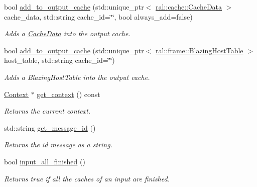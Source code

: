 \begin{DoxyCompactItemize}
bool \hyperlink{classral_1_1cache_1_1kernel_ad8cd102392bbece14178c0ebf9f0c6bc}{add\+\_\+to\+\_\+output\+\_\+cache} (std\+::unique\+\_\+ptr$<$ \hyperlink{classral_1_1cache_1_1CacheData}{ral\+::cache\+::\+Cache\+Data} $>$ cache\+\_\+data, std\+::string cache\+\_\+id=\char`\"{}\char`\"{}, bool always\+\_\+add=false)
\begin{DoxyCompactList}\small\item\em Adds a \hyperlink{classral_1_1cache_1_1CacheData}{Cache\+Data} into the output cache. \end{DoxyCompactList}\item 
bool \hyperlink{classral_1_1cache_1_1kernel_a94e93c7bb81d9a3a7729fa84a7cf07c1}{add\+\_\+to\+\_\+output\+\_\+cache} (std\+::unique\+\_\+ptr$<$ \hyperlink{classral_1_1frame_1_1BlazingHostTable}{ral\+::frame\+::\+Blazing\+Host\+Table} $>$ host\+\_\+table, std\+::string cache\+\_\+id=\char`\"{}\char`\"{})
\begin{DoxyCompactList}\small\item\em Adds a Blazing\+Host\+Table into the output cache. \end{DoxyCompactList}\item 
\mbox{\label{classral_1_1cache_1_1kernel_a6d078d50dd69a9444fcd5d73f378e2d1}} 
\hyperlink{classblazingdb_1_1manager_1_1Context}{Context} $\ast$ \hyperlink{classral_1_1cache_1_1kernel_a6d078d50dd69a9444fcd5d73f378e2d1}{get\+\_\+context} () const
\begin{DoxyCompactList}\small\item\em Returns the current context. \end{DoxyCompactList}\item 
\mbox{\label{classral_1_1cache_1_1kernel_aa9e353759b65c2c53571cf80b0213d31}} 
std\+::string \hyperlink{classral_1_1cache_1_1kernel_aa9e353759b65c2c53571cf80b0213d31}{get\+\_\+message\+\_\+id} ()
\begin{DoxyCompactList}\small\item\em Returns the id message as a string. \end{DoxyCompactList}\item 
\mbox{\label{classral_1_1cache_1_1kernel_aa8af91bb80e9153e307e07c3010c217a}} 
bool \hyperlink{classral_1_1cache_1_1kernel_aa8af91bb80e9153e307e07c3010c217a}{input\+\_\+all\+\_\+finished} ()
\begin{DoxyCompactList}\small\item\em Returns true if all the caches of an input are finished. \end{DoxyCompactList}\item 

\end{DoxyCompactItemize}
